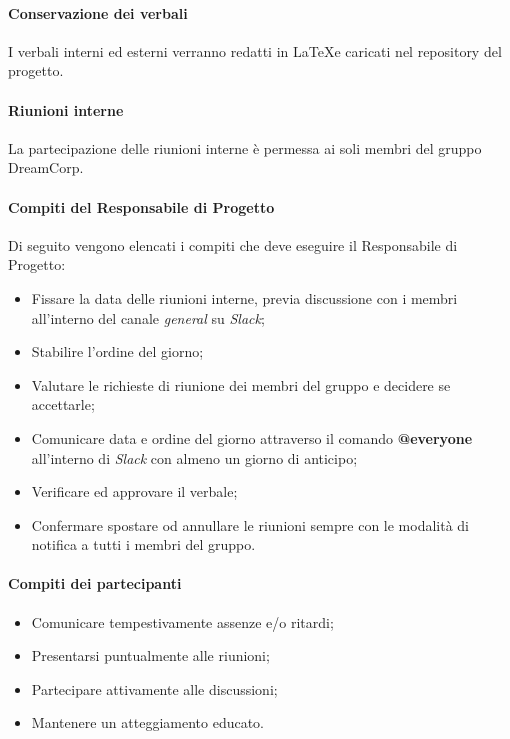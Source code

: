                         \paragraph{Conservazione dei verbali}
                            I verbali interni ed esterni verranno redatti in \LaTeX e caricati nel repository del progetto.
                    \paragraph{Riunioni interne}
                        La partecipazione delle riunioni interne è permessa ai soli membri del gruppo DreamCorp.
                        \newline
                        \paragraph{Compiti del Responsabile di Progetto}
                            Di seguito vengono elencati i compiti che deve eseguire il Responsabile di Progetto:
                            \begin{itemize}
                                \item Fissare la data delle riunioni interne, previa discussione con i membri all'interno del canale \textit{general} su \textit{Slack};
                                \item Stabilire l'ordine del giorno;
                                \item Valutare le richieste di riunione dei membri del gruppo e decidere se accettarle;
                                \item Comunicare data e ordine del giorno attraverso il comando \textbf{@everyone} all'interno di \textit{Slack} con almeno un giorno di anticipo;
                                \item Verificare ed approvare il verbale;
                                \item Confermare spostare od annullare le riunioni sempre con le modalità di notifica a tutti i membri del gruppo.
                             \end{itemize}
                         \paragraph{Compiti dei partecipanti}
                            \begin{itemize}
                                \item Comunicare tempestivamente assenze e/o ritardi; 
                                \item Presentarsi puntualmente alle riunioni;
                                \item Partecipare attivamente alle discussioni;
                                \item Mantenere un atteggiamento educato.
                            \end{itemize}
